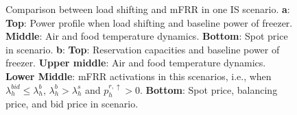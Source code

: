 \begin{figure}[t]
    \caption{Comparison between load shifting and mFRR in one IS scenario. \textbf{a}: \textbf{Top}: Power profile when load shifting and baseline power of freezer. \textbf{Middle}: Air and food temperature dynamics. \textbf{Bottom}: Spot price in scenario. \textbf{b}: \textbf{Top}: Reservation capacities and baseline power of freezer. \textbf{Upper middle}: Air and food temperature dynamics. \textbf{Lower Middle}: mFRR activations in this scenarios, i.e., when $\lambda_{h}^{bid} \leq \lambda_{h}^{b}$, $\lambda_{h}^{b} > \lambda_{h}^{s}$ and $p^{r,\uparrow}_{h} > 0$. \textbf{Bottom}: Spot price, balancing price, and bid price in scenario.}
    \label{fig:fig_sim}
\end{figure}

